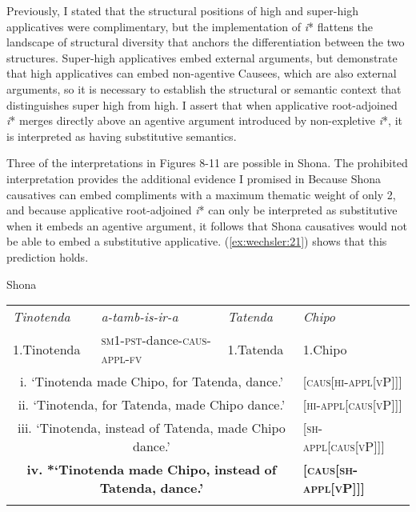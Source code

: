 \documentclass[output=paper]{langscibook}
\begin{document}
Previously, I stated that the structural positions of high and super-high applicatives were complimentary, but the implementation of \textit{i}* flattens the landscape of structural diversity that anchors the differentiation between the two structures. Super-high applicatives embed external arguments, but  demonstrate that high applicatives can embed non-agentive Causees, which are also external arguments, so it is necessary to establish the structural or semantic context that distinguishes super high from high. I assert that when applicative root-adjoined \textit{i}* merges directly above an agentive argument introduced by non-expletive \textit{i}*, it is interpreted as having substitutive semantics. 



Three of the interpretations in Figures 8-11 are possible in Shona. The prohibited interpretation provides the additional evidence I promised in  Because Shona causatives can embed compliments with a maximum thematic weight of only 2, and because applicative root-adjoined \textit{i}* can only be interpreted as substitutive when it embeds an agentive argument, it follows that Shona causatives would not be able to embed a substitutive applicative. (\ref{ex:wechsler:21}) shows that this prediction holds. 


\ea\label{ex:wechsler:21}
Shona\\

\begin{tabularx}{\textwidth}{XXXX}
\lsptoprule
{\itshape Tinotenda}  & \textit{a-tamb-is-ir-a}                                                                      & \textit{Tatenda} & {\itshape Chipo}\\
1.Tinotenda & \textsc{sm1-pst}{}-dance-\textsc{caus-appl-fv} & 1.Tatenda & 1.Chipo\\
\multicolumn{3}{c}{i. ‘Tinotenda made Chipo, for Tatenda, dance.’}  & \textsc{[caus[hi-appl[vP]]]}\\
\multicolumn{3}{c}{ii. ‘Tinotenda, for Tatenda, made Chipo dance.’} & \textsc{[hi-appl[caus[vP]]]}\\
\multicolumn{3}{c}{iii. ‘Tinotenda, instead of Tatenda, made Chipo dance.’} & \textsc{[sh-appl[caus[vP]]]}\\
\multicolumn{3}{c}{\textbf{iv.} \textbf{*‘Tinotenda} \textbf{made} \textbf{Chipo,} \textbf{instead} \textbf{of} \textbf{Tatenda,} \textbf{dance.’}} & \textbf{\textsc{[caus[sh-appl[vP]]]}}\\
\lspbottomrule
\end{tabularx}
\z
\end{document}
